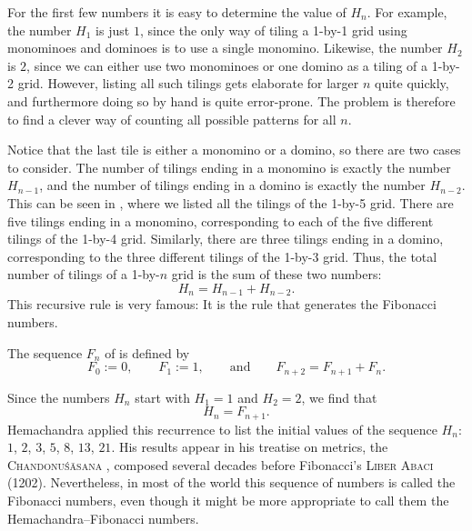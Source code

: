 For the first few numbers it is easy to determine the value of $H_n$. For example, the number $H_1$ is just $1$, since the only way of tiling a 1-by-1 grid using monominoes and dominoes is to use a single monomino. Likewise, the number $H_2$ is $2$, since we can either use two monominoes or one domino as a tiling of a 1-by-2 grid. However, listing all such tilings gets elaborate for larger $n$ quite quickly, and furthermore doing so by hand is quite error-prone. The problem is therefore to find a clever way of counting all possible patterns for all $n$.

Notice that the last tile is either a monomino or a domino, so there are two cases to consider. The number of tilings ending in a monomino is exactly the number $H_{n-1}$, and the number of tilings ending in a domino is exactly the number $H_{n-2}$. This can be seen in , where we listed all the tilings of the 1-by-5 grid. There are five tilings ending in a monomino, corresponding to each of the five different tilings of the 1-by-4 grid. Similarly, there are three tilings ending in a domino, corresponding to the three different tilings of the 1-by-3 grid. Thus, the total number of tilings of a 1-by-$n$ grid is the sum of these two numbers:
\begin{equation*}
  H_n = H_{n-1} + H_{n-2}.
\end{equation*}
This recursive rule is very famous: It is the rule that generates the Fibonacci numbers.

\begin{definition}
  The sequence $F_n$ of  is defined by
  \begin{equation*}
    F_0:= 0,\qquad F_1:= 1,\qquad\text{and}\qquad F_{n+2}=F_{n+1}+F_{n}.
  \end{equation*}
\end{definition}

Since the numbers $H_n$ start with $H_1=1$ and $H_2=2$, we find that
\begin{equation*}
  H_n = F_{n+1}.
\end{equation*}
Hemachandra applied this recurrence to list the initial values of the sequence $H_n$:  $1$, $2$, $3$, $5$, $8$, $13$, $21$. His results appear in his treatise on metrics, the \textsc{Chandonuśāsana} \cite{hemachandra1961}, composed several decades before Fibonacci's \textsc{Liber Abaci} (1202). Nevertheless, in most of the world this sequence of numbers is called the Fibonacci numbers, even though it might be more appropriate to call them the Hemachandra--Fibonacci numbers.

